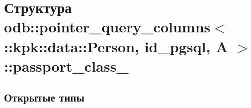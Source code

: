 \hypertarget{structodb_1_1pointer__query__columns_3_01_1_1kpk_1_1data_1_1_person_00_01id__pgsql_00_01_a_01_4_1_1passport__class__}{}\section{Структура odb\+:\+:pointer\+\_\+query\+\_\+columns$<$ \+:\+:kpk\+:\+:data\+:\+:Person, id\+\_\+pgsql, A $>$\+:\+:passport\+\_\+class\+\_\+}
\label{structodb_1_1pointer__query__columns_3_01_1_1kpk_1_1data_1_1_person_00_01id__pgsql_00_01_a_01_4_1_1passport__class__}
\subsection*{Открытые типы}
